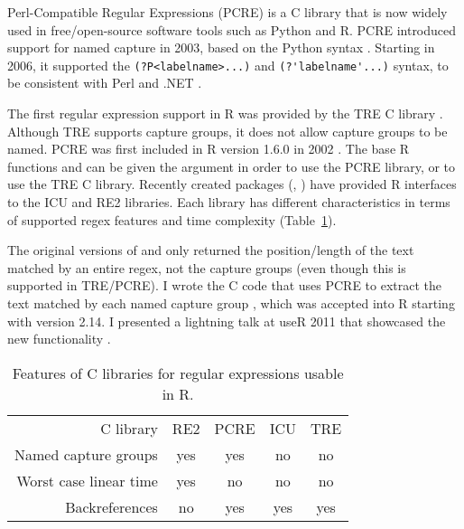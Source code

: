 Perl-Compatible Regular Expressions (PCRE) is a C library that is now
widely used in free/open-source software tools such as Python and R.
PCRE introduced support for named capture in 2003, based on the Python
syntax \citep{pcre1-changelog.txt}. Starting in 2006, it supported the
\verb|(?P<labelname>...)| and \verb|(?'labelname'...)| syntax, to be
consistent with Perl and .NET \citep{pcre1-changelog.txt}.



The first regular expression support in R was provided by the TRE C
library \citep{TRE}. Although TRE supports capture groups, it does not
allow capture groups to be named. PCRE was first included in R version
1.6.0 in 2002 \citep{R.NEWS.1.txt}. The base R functions
 and  can be given the 
argument in order to use the PCRE library, or  to use
the TRE C library. Recently created packages
(, ) have provided R interfaces to the
ICU and RE2 libraries. Each library has different characteristics in
terms of supported regex features and time complexity
(Table~\ref{tab:regex-libraries}).


The original versions of  and  only
returned the position/length of the text matched by an entire regex,
not the capture groups (even though this is supported in TRE/PCRE). I
wrote the C code that uses PCRE to extract the text matched by each
named capture group \citep{HockingBug2011}, which was accepted into R
starting with version 2.14. I presented a lightning talk at useR 2011
that showcased the new functionality \citep{HockingUseR2011}.

\begin{table}
  \centering
  \begin{tabular}{r|cccc}
    C library & RE2 & PCRE & ICU & TRE \\
    Named capture groups  & yes & yes & no & no\\
    Worst case linear time & yes & no & no & no \\
    Backreferences & no & yes & yes & yes 
  \end{tabular}
  \caption{\label{tab:regex-libraries}
    Features of C libraries for regular expressions usable in R.
    }
\end{table}

